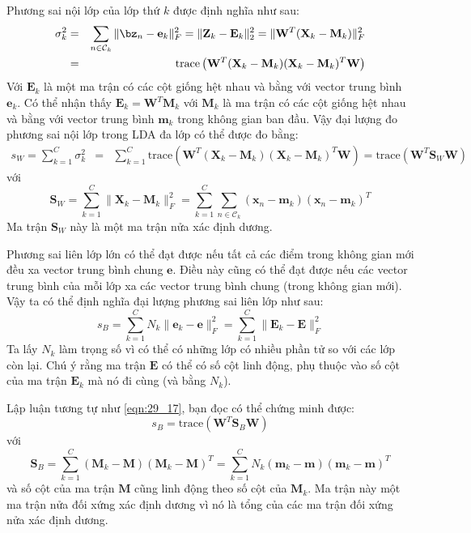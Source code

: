 Phương sai nội lớp của lớp thứ $k$ được định nghĩa như sau:
\begin{eqnarray}
\label{eqn:29_15}
\sigma_k^2 &=& \sum_{n \in \mathcal{C}_k} \|\bz_n -\mathbf{e}_k\|_F^2 = \|\mathbf{Z}_k - \mathbf{E}_k\|_2^2
= \|\mathbf{W}^T (\mathbf{X}_k - \mathbf{M}_k) \|_F^2\\\
&=& \text{trace}\left(\mathbf{W}^T (\mathbf{X}_k - \mathbf{M}_k)(\mathbf{X}_k - \mathbf{M}_k)^T \mathbf{W}\right)
\end{eqnarray}
Với $\mathbf{E}_k$ là một ma trận có các cột giống hệt nhau và bằng với vector trung bình $\mathbf{e}_k$. Có thể nhận thấy $ \mathbf{E}_k =
\mathbf{W}^T\mathbf{M}_k$ với $\mathbf{M}_k$ là ma trận có các cột giống hệt
nhau và bằng với vector trung bình $\mathbf{m}_k$ trong không gian ban đầu.
Vậy đại lượng đo phương sai nội lớp trong LDA đa lớp có thể được đo bằng:
\begin{eqnarray}
\nonumber
\label{eqn:29_17}
s_W = \sum_{k = 1}^C \sigma_k^2 &=& \sum_{k=1}^C
\text{trace}\left(\mathbf{W}^T (\mathbf{X}_k - \mathbf{M}_k)(\mathbf{X}_k - \mathbf{M}_k)^T \mathbf{W}\right) = \text{trace}\left( \mathbf{W}^T\mathbf{S}_W \mathbf{W}\right)
\end{eqnarray}
với
\begin{equation}
\label{eqn:29_19}
\mathbf{S}_W = \sum_{k=1}^C \|\mathbf{X}_k- \mathbf{M}_k \|_F^2 = \sum_{k=1}^C \sum_{n \in \mathcal{C}_k} (\mathbf{x}_n - \mathbf{m}_k)(\mathbf{x}_n - \mathbf{m}_k)^T
\end{equation}
Ma trận $\mathbf{S}_W$ này là một ma trận nửa xác định dương.


Phương sai liên lớp lớn có thể đạt được nếu tất cả các điểm trong
không gian mới đều xa vector trung bình chung $\mathbf{e}$. Điều này cũng có thể
đạt được nếu các vector trung bình của mỗi lớp xa các vector trung bình chung
(trong không gian mới). Vậy ta có thể định nghĩa đại lượng phương sai liên lớp như sau:
\begin{equation}
\label{eqn:29_20}
s_B = \sum_{k=1}^C N_k \|\mathbf{e}_k - \mathbf{e} \|_F^2 = \sum_{k=1}^C \|\mathbf{E}_k - \mathbf{E} \|_F^2
\end{equation}
Ta lấy $N_k$ làm trọng số vì có thể có những lớp có nhiều phần tử so với các
lớp còn lại. Chú ý rằng ma trận $\mathbf{E}$ có thể có số cột {linh
động}, phụ thuộc vào số cột của ma trận $\mathbf{E}_k$ mà nó đi cùng (và bằng $N_k$).

Lập luận tương tự như \eqref{eqn:29_17}, bạn đọc có thể chứng minh được:
\begin{equation}
\label{eqn:29_21}
s_B = \text{trace} \left(\mathbf{W}^T \mathbf{S}_B \mathbf{W} \right)
\end{equation}
với
\begin{equation}
\label{eqn:29_22}
\mathbf{S}_B = \sum_{k = 1}^C (\mathbf{M}_k - \mathbf{M})(\mathbf{M}_k - \mathbf{M})^T = \sum_{k=1}^C N_k (\mathbf{m}_k - \mathbf{m})(\mathbf{m}_k - \mathbf{m})^T
\end{equation}
và số cột của ma trận $\mathbf{M}$ cũng {linh động} theo số cột của $\mathbf{M}_k$. Ma trận này một ma trận nửa đối xứng xác định dương vì nó là
tổng của các ma trận đối xứng nửa xác định dương.



